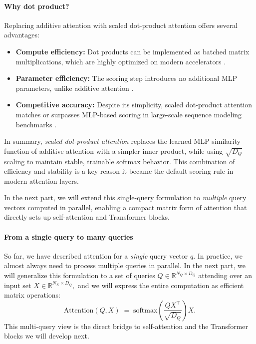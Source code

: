 \paragraph{Why dot product?}

\noindent
Replacing additive attention with scaled dot-product attention offers several advantages:
\begin{itemize}
	\item \textbf{Compute efficiency:} Dot products can be implemented as batched matrix multiplications, which are highly optimized on modern accelerators \cite{vaswani2017_attention}.
	\item \textbf{Parameter efficiency:} The scoring step introduces no additional MLP parameters, unlike additive attention \cite{bahdanau2016_neural}.
	\item \textbf{Competitive accuracy:} Despite its simplicity, scaled dot-product attention matches or surpasses MLP-based scoring in large-scale sequence modeling benchmarks \cite{bahdanau2016_neural,vaswani2017_attention}.
\end{itemize}

\noindent
In summary, \emph{scaled dot-product attention} replaces the learned MLP similarity function of additive attention with a simpler inner product, while using \(\sqrt{D_Q}\) scaling to maintain stable, trainable softmax behavior.
This combination of efficiency and stability is a key reason it became the default scoring rule in modern attention layers.

\noindent
In the next part, we will extend this single-query formulation to \emph{multiple} query vectors computed in parallel, enabling a compact matrix form of attention that directly sets up self-attention and Transformer blocks.


\paragraph{From a single query to many queries}

\noindent
So far, we have described attention for a \emph{single} query vector \(q\).
In practice, we almost always need to process multiple queries in parallel.
In the next part, we will generalize this formulation to a set of queries
\(
Q \in \mathbb{R}^{N_Q \times D_Q}
\)
attending over an input set
\(
X \in \mathbb{R}^{N_X \times D_Q},
\)
and we will express the entire computation as efficient matrix operations:
\[
\text{Attention}(Q, X)
\;=\;
\text{softmax}\!\left(\frac{QX^{\top}}{\sqrt{D_Q}}\right)X.
\]
This multi-query view is the direct bridge to self-attention and the Transformer blocks we will develop next.

